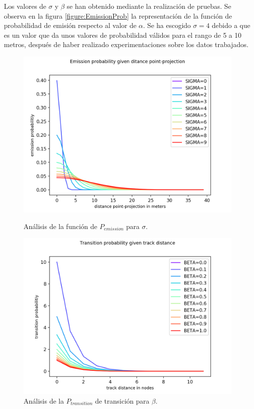 Los valores de $\sigma$ y $\beta$ se han obtenido mediante la realización de pruebas. 
Se observa en la figura \ref{figure:EmissionProb} la representación de la función de 
probabilidad de emisión respecto al valor de $\alpha$. Se ha escogido $\sigma = 4$ 
debido a que es un valor que da unos valores de probabilidad válidos para el rango de 5 
a 10 metros, después de haber realizado experimentaciones sobre los datos 
trabajados.

\begin{figure}[!htb]
\begin{minipage}{0.46\textwidth}
\centering
\includegraphics[width=1.2\textwidth]{./Imagenes/EmissionProb.png}
\caption{Análisis de la función de $P_{emission}$ para $\sigma$.}
\label{figure:EmissionProb}
\end{minipage}\hfill
\begin{minipage}{0.46\textwidth}
\centering
\includegraphics[width=1.2\textwidth]{./Imagenes/TransitionProb.png}
\caption{Análisis de la $P_{transition}$ de transición para $\beta$.}
\label{figure:TransitionProb}
\end{minipage}
\end{figure}

